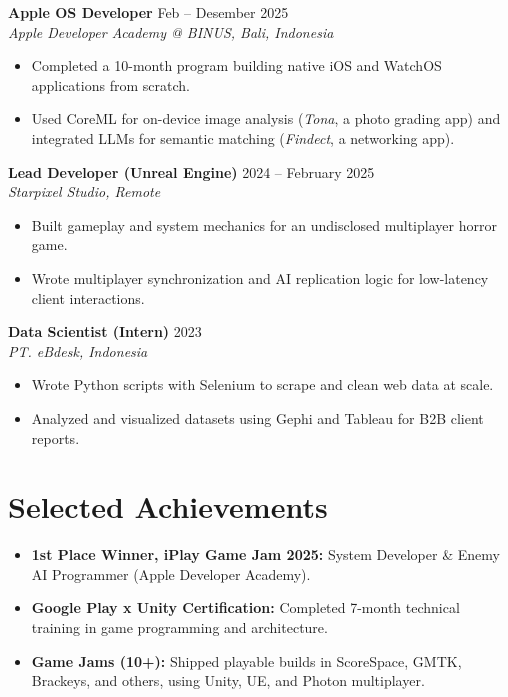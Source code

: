 \documentclass[11pt,a4paper]{article}
\begin{document}
\vspace{0.5em}
\noindent
\textbf{Apple OS Developer} \hfill Feb -- Desember 2025 \\
\textit{Apple Developer Academy @ BINUS, Bali, Indonesia}
\begin{itemize}
    \item Completed a 10-month program building native iOS and WatchOS applications from scratch.
    \item Used CoreML for on-device image analysis (\textit{Tona}, a photo grading app) and integrated LLMs for semantic matching (\textit{Findect}, a networking app).
\end{itemize}

\vspace{0.5em}
\noindent
\textbf{Lead Developer (Unreal Engine)} \hfill 2024 -- February 2025 \\
\textit{Starpixel Studio, Remote}
\begin{itemize}
    \item Built gameplay and system mechanics for an undisclosed multiplayer horror game.
    \item Wrote multiplayer synchronization and AI replication logic for low-latency client interactions.
\end{itemize}

\vspace{0.5em}
\noindent
\textbf{Data Scientist (Intern)} \hfill 2023 \\
\textit{PT. eBdesk, Indonesia}
\begin{itemize}
    \item Wrote Python scripts with Selenium to scrape and clean web data at scale.
    \item Analyzed and visualized datasets using Gephi and Tableau for B2B client reports.
\end{itemize}

\section*{Selected Achievements}
\begin{itemize}
    \item \textbf{1st Place Winner, iPlay Game Jam 2025:} System Developer \& Enemy AI Programmer (Apple Developer Academy).
    \item \textbf{Google Play x Unity Certification:} Completed 7-month technical training in game programming and architecture.
    \item \textbf{Game Jams (10+):} Shipped playable builds in ScoreSpace, GMTK, Brackeys, and others, using Unity, UE, and Photon multiplayer.
\end{itemize}
\end{document}
